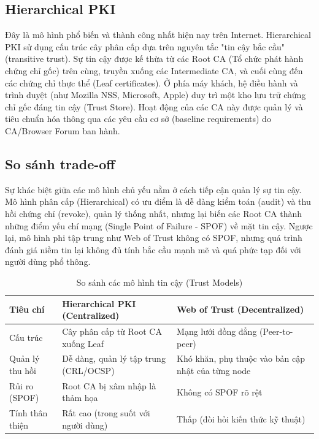 \subsection{Hierarchical PKI}
Đây là mô hình phổ biến và thành công nhất hiện nay trên Internet. Hierarchical PKI sử dụng cấu trúc cây phân cấp dựa trên nguyên tắc "tin cậy bắc cầu" (transitive trust). Sự tin cậy được kế thừa từ các Root CA (Tổ chức phát hành chứng chỉ gốc) trên cùng, truyền xuống các Intermediate CA, và cuối cùng đến các chứng chỉ thực thể (Leaf certificates). Ở phía máy khách, hệ điều hành và trình duyệt (như Mozilla NSS, Microsoft, Apple) duy trì một kho lưu trữ chứng chỉ gốc đáng tin cậy (Trust Store). Hoạt động của các CA này được quản lý và tiêu chuẩn hóa thông qua các yêu cầu cơ sở (baseline requirements) do CA/Browser Forum \cite{CABForum} ban hành.

\subsection{So sánh trade-off}
Sự khác biệt giữa các mô hình chủ yếu nằm ở cách tiếp cận quản lý sự tin cậy. Mô hình phân cấp (Hierarchical) có ưu điểm là dễ dàng kiểm toán (audit) và thu hồi chứng chỉ (revoke), quản lý thống nhất, nhưng lại biến các Root CA thành những điểm yếu chí mạng (Single Point of Failure - SPOF) về mặt tin cậy. Ngược lại, mô hình phi tập trung như Web of Trust không có SPOF, nhưng quá trình đánh giá niềm tin lại không đủ tính bắc cầu mạnh mẽ và quá phức tạp đối với người dùng phổ thông.

\begin{table}[h]
    \centering
    \caption{So sánh các mô hình tin cậy (Trust Models)}
    \label{tab:trust-models}
    \begin{tabular}{|p{3cm}|p{6cm}|p{6cm}|}
        \hline
        \textbf{Tiêu chí} & \textbf{Hierarchical PKI (Centralized)} & \textbf{Web of Trust (Decentralized)} \\
        \hline
        Cấu trúc & Cây phân cấp từ Root CA xuống Leaf & Mạng lưới đồng đẳng (Peer-to-peer) \\
        \hline
        Quản lý thu hồi & Dễ dàng, quản lý tập trung (CRL/OCSP) & Khó khăn, phụ thuộc vào bản cập nhật của từng node \\
        \hline
        Rủi ro (SPOF) & Root CA bị xâm nhập là thảm họa & Không có SPOF rõ rệt \\
        \hline
        Tính thân thiện & Rất cao (trong suốt với người dùng) & Thấp (đòi hỏi kiến thức kỹ thuật) \\
        \hline
    \end{tabular}
\end{table}


